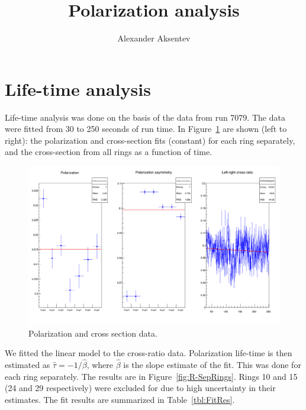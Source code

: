 \documentclass{article}
\begin{document}
\title{Polarization analysis}
\author{Alexander Aksentev}
\maketitle
	
\section{Life-time analysis}
Life-time analysis was done on the basis of the data from run 7079. The data were fitted from 30 to 250 seconds of run time. In Figure~\ref{fig:ROOT-AllRings} are shown (left to right): the polarization and cross-section fits (constant) for each ring separately, and the cross-section from all rings as a function of time.
\begin{figure}[h]
	\centering
	\includegraphics[scale=.35]{PolAna-ROOT-all}
	\caption{Polarization and  cross section data.\label{fig:ROOT-AllRings}}
\end{figure}

We fitted the linear model to the cross-ratio data. Polarization life-time is then estimated as $\hat{\tau} = -1/\hat{\beta}$, where $\hat{\beta}$ is the slope estimate of the fit. This was done for each ring separately. The results are in Figure~\ref{fig:R-SepRings}. Rings 10 and 15 (24 and 29 respectively) were excluded for due to high uncertainty in their estimates. The fit results are summarized in Table~\ref{tbl:FitRes}.
\end{document}
